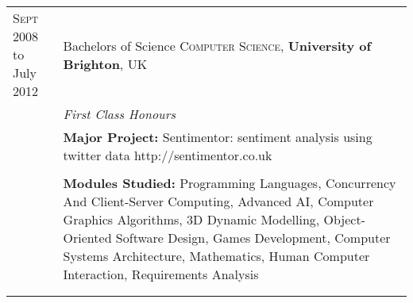 \documentclass[a4paper,10pt]{article} %
\begin{document}
\begin{tabular}{ L{2cm} | L{11cm}}	
\textsc{Sept} 2008 to July 2012  & Bachelors of Science \textsc{Computer Science}, \textbf{University of Brighton}, UK\\
& \small\emph{First Class Honours} \\
& \small\textbf{Major Project:} Sentimentor: sentiment analysis using twitter data http://sentimentor.co.uk \\
&\normalsize \\
& \small\textbf{Modules Studied:} Programming Languages, Concurrency And Client-Server Computing, Advanced AI, Computer Graphics Algorithms, 3D Dynamic Modelling, Object-Oriented Software Design, Games Development, Computer Systems Architecture, Mathematics, Human Computer Interaction, Requirements Analysis  \\
&\\

 \\




%
%
%
%

\end{tabular}
\end{document}
